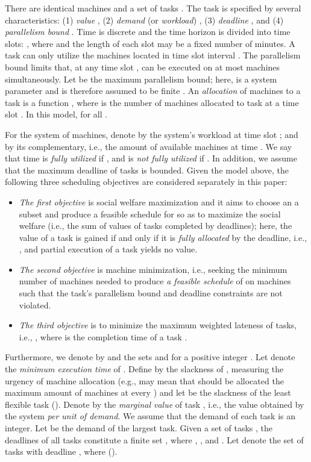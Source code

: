 \documentclass[10pt,journal,compsoc]{IEEEtran}
\begin{document}
There are  identical machines and a set of  tasks . The task  is specified by several characteristics: (1) {\em value} , (2) {\em demand} (or {\em workload}) , (3) {\em deadline} , and (4) {\em parallelism bound} . Time is discrete and the time horizon is divided into  time slots: , where  and the length of each slot may be a fixed number of minutes. A task  can only utilize the machines located in time slot interval . The parallelism bound  limits that, at any time slot ,  can be executed on at most  machines simultaneously. Let  be the maximum parallelism bound; here,  is a system parameter and  is therefore assumed to be finite \cite{White}. An {\em allocation} of machines to a task  is a function , where  is the number of machines allocated to task  at a time slot . In this model,  for all .

For the system of  machines, denote by  the system's workload at time slot ; and by  its complementary, i.e., the amount of available machines at time . We say that time  is {\em fully utilized} if , and is {\em not fully utilized} if . In addition, we assume that the maximum deadline of tasks is bounded. Given the model above, the following three scheduling objectives are considered separately in this paper:
\begin{itemize}
  \setlength\itemsep{0.17em}
\item \textit{The first objective} is social welfare maximization and it aims to choose an a subset  and produce a feasible schedule for  so as to maximize the social welfare  (i.e., the sum of values of tasks completed by deadlines); here, the value  of a task  is gained if and only if it is {\em fully allocated} by the deadline, i.e., , and partial execution of a task yields no value.
\item \textit{The second objective} is machine minimization, i.e., seeking the minimum number of machines needed to produce {\em a feasible schedule} of  on  machines such that the task's parallelism bound and deadline constraints are not violated.
\item \textit{The third objective} is to minimize the maximum weighted lateness of tasks, i.e., , where  is the completion time of a task .
\end{itemize}
Furthermore, we denote by  and  the sets  and  for a positive integer . Let  denote the {\em minimum execution time} of . Define by  the slackness of , measuring the urgency of machine allocation (e.g.,  may mean that  should be allocated the maximum amount of machines  at every ) and let  be the slackness of the least flexible task (). Denote by  the {\em marginal value} of task , i.e., the value obtained by the system {\em per unit of demand}. We assume that the demand of each task is an integer. Let  be the demand of the largest task. Given a set of tasks , the deadlines  of all tasks  constitute a finite set , where , , and . Let  denote the set of tasks with deadline , where  ().
\end{document}

